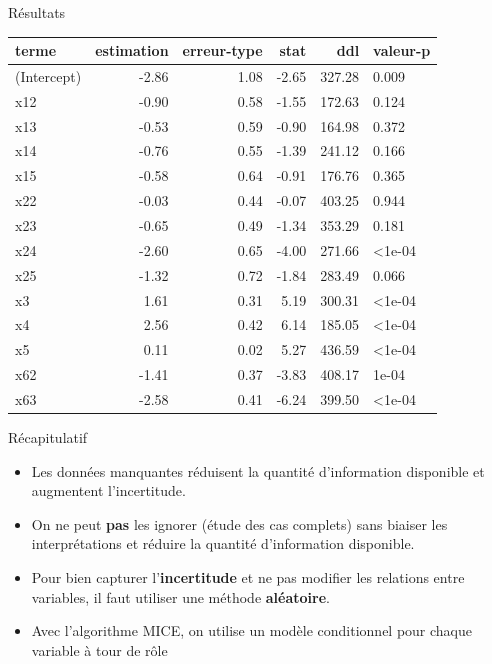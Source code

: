 \documentclass[
  ignorenonframetext,
]{beamer}
\providecommand{\tightlist}{%
  \setlength{\itemsep}{0pt}\setlength{\parskip}{0pt}}\usepackage{longtable,booktabs,array}
\begin{document}
\begin{frame}{Résultats}
\protect\hypertarget{ruxe9sultats}{}
\begin{table}
\centering
\begin{tabular}{lrrrrl}
\toprule
terme & estimation & erreur-type & stat & ddl & valeur-p\\
\midrule
(Intercept) & -2.86 & 1.08 & -2.65 & 327.28 & 0.009\\
x12 & -0.90 & 0.58 & -1.55 & 172.63 & 0.124\\
x13 & -0.53 & 0.59 & -0.90 & 164.98 & 0.372\\
x14 & -0.76 & 0.55 & -1.39 & 241.12 & 0.166\\
x15 & -0.58 & 0.64 & -0.91 & 176.76 & 0.365\\
x22 & -0.03 & 0.44 & -0.07 & 403.25 & 0.944\\
x23 & -0.65 & 0.49 & -1.34 & 353.29 & 0.181\\
x24 & -2.60 & 0.65 & -4.00 & 271.66 & <1e-04\\
x25 & -1.32 & 0.72 & -1.84 & 283.49 & 0.066\\
x3 & 1.61 & 0.31 & 5.19 & 300.31 & <1e-04\\
x4 & 2.56 & 0.42 & 6.14 & 185.05 & <1e-04\\
x5 & 0.11 & 0.02 & 5.27 & 436.59 & <1e-04\\
x62 & -1.41 & 0.37 & -3.83 & 408.17 & 1e-04\\
x63 & -2.58 & 0.41 & -6.24 & 399.50 & <1e-04\\
\bottomrule
\end{tabular}
\end{table}
\end{frame}

\begin{frame}{Récapitulatif}
\protect\hypertarget{ruxe9capitulatif}{}
\begin{itemize}
\tightlist
\item
  Les données manquantes réduisent la quantité d'information disponible
  et augmentent l'incertitude.
\item
  On ne peut \textbf{pas} les ignorer (étude des cas complets) sans
  biaiser les interprétations et réduire la quantité d'information
  disponible.
\item
  Pour bien capturer l'\textbf{incertitude} et ne pas modifier les
  relations entre variables, il faut utiliser une méthode
  \textbf{aléatoire}.
\item
  Avec l'algorithme MICE, on utilise un modèle conditionnel pour chaque
  variable à tour de rôle
\end{itemize}
\end{frame}
\end{document}
